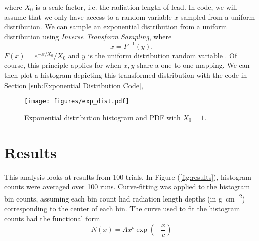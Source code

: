 \documentclass{article}
\newcommand{\radlen}{\gram\per\cm^2}
\begin{document}
where \( X_{0} \) is a scale factor, i.e. the radiation length of lead. In code, we will assume that we only have access to a random variable \( x \) sampled from a uniform distribution. We can sample an exponential distribution from a uniform distribution using \textit{Inverse Transform Sampling}, where
\begin{equation}
    x = F^{-1} (y) .
\end{equation}
\( F(x)= e^{-x / X_{0}} / X_{0} \) and \( y \) is the uniform distribution random variable \cite{bohm}. Of course, this principle applies for when \( x, y \) share a one-to-one mapping. We can then plot a histogram depicting this transformed distribution with the code in Section \ref{sub:Exponential Distribution Code},

\begin{figure}[htpb]
    \begin{center}
        \texttt{[image: figures/exp\_dist.pdf]}
    \end{center}
    \caption{Exponential distribution histogram and PDF with \( X_{0} = 1 \).}\label{fig:exp-dist}
\end{figure}

\subsection{} %
\label{sub:}


\section{Results} %
\label{sec:Results}

\iffalse
\begin{figure}[htpb]
    \begin{center}
        \texttt{[image: figures/charged\_depth\_hist.pdf]}
    \end{center}
    \caption{Histogram of charged particle radiation lengths}\label{fig:hist}
\end{figure}
\fi

This analysis looks at results from 100 trials. In Figure (\ref{fig:results}), histogram counts were averaged over 100 runs. Curve-fitting was applied to the histogram bin counts, assuming each bin count had radiation length depths (in \unit{\radlen}) corresponding to the center of each bin. The curve used to fit the histogram counts had the functional form
\begin{equation}
    N(x) = A x^b \exp \left(-\frac{x}{c}\right)
\end{equation}
\end{document}
